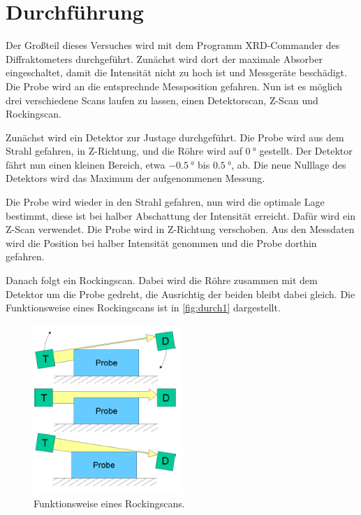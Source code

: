 \section{Durchführung}
\label{sec:Durchführung}

Der Großteil dieses Versuches wird mit dem Programm XRD-Commander des Diffraktometers durchgeführt.
Zunächst wird dort der maximale Absorber eingeschaltet, damit die Intensität nicht zu hoch ist und Messgeräte beschädigt.
Die Probe wird an die entsprechnde Messposition gefahren.
Nun ist es möglich drei verschiedene Scans laufen zu lassen, einen Detektorscan, Z-Scan und Rockingscan.

Zunächst wird ein Detektor zur Justage durchgeführt.
Die Probe wird aus dem Strahl gefahren, in Z-Richtung, und die Röhre wird auf $\SI{0}{\degree}$ gestellt.
Der Detektor fährt nun einen kleinen Bereich, etwa $\SI{-0.5}{\degree}$ bis $\SI{0.5}{\degree}$, ab.
Die neue Nulllage des Detektors wird das Maximum der aufgenommenen Messung.

Die Probe wird wieder in den Strahl gefahren, nun wird die optimale Lage bestimmt, diese ist bei halber Abschattung der Intensität erreicht.
Dafür wird ein Z-Scan verwendet. 
Die Probe wird in Z-Richtung verschoben.
Aus den Messdaten wird die Position bei halber Intensität genommen und die Probe dorthin gefahren.

Danach folgt ein Rockingscan. 
Dabei wird die Röhre zusammen mit dem Detektor um die Probe gedreht, die Ausrichtig der beiden bleibt dabei gleich.
Die Funktionsweise eines Rockingscans ist in \autoref{fig:durch1} dargestellt.

\begin{figure}
    \centering
    \includegraphics[width=0.5\textwidth]{images/rocking.png}
    \caption{Funktionsweise eines Rockingscans. \cite{V44}}
    \label{fig:durch1}
\end{figure}

